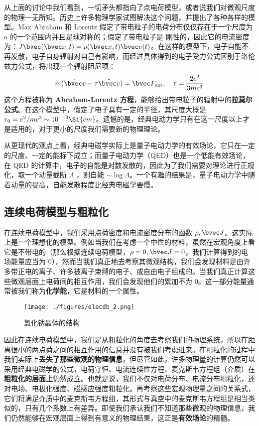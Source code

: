 从上面的讨论中我们看到，一切矛头都指向了点电荷模型，或者说我们对微观尺度的物理一无所知。历史上许多物理学家试图解决这个问题，并提出了各种各样的模型。Max Abraham 和 Lorentz 假定了带电粒子的电荷分布仅仅存在于一个尺度为 $a$ 的一个范围内并且是球对称的；假定了带电粒子是
刚性的，因此它的电流密度为：$J\bvec (\bvec x, t) =\rho(\bvec x, t)\bvec v(t)$。在这样的模型下，电子自能不再发散，电子自身辐射对自己有影响，而经过具体得到的电子受力公式区别于洛伦兹力公式，将出现一个辐射阻尼项：
\begin{equation}
m(\dot{\bvec v}-\tau \ddot{\bvec v})=\bvec F_{\text{ext}},\quad \tau =\frac{2e^2}{3mc^3}
\end{equation}
这个方程被称为 \textbf{Abraham-Lorentz 方程}，能够给出带电粒子的辐射中的\textbf{拉莫尔公式}。在这个模型中，假定了电子具有一定的半径，其尺度大概是 $r_0=e^2/mc^2\sim 10^{-13} \Si{cm}$。遗憾的是，经典电动力学只有在这一尺度以上才是适用的，对于更小的尺度我们需要新的物理理论。

从更现代的观点上看，经典电磁学实际上是量子电动力学的有效场论，它只在一定的尺度、一定的能标下成立；而量子电动力学（QED）也是一个低能有效场论，在 QED 的计算中，电子的自能是对数发散的，因此为了我们需要对理论进行正规化，取一个动量截断 $\Lambda$ ，则自能 $\sim \log \Lambda$。一个有趣的结果是，量子电动力学中随着动量的提高，自能发散程度比经典电磁学要慢。

\subsection{连续电荷模型与粗粒化}
在连续电荷模型中，我们采用点荷密度和电流密度分布的函数 $\rho,\bvec J$。这实际上是一个理想化的模型。例如当我们在考虑一个中性的材料，虽然在宏观角度上看它是不带电的（那么根据连续电荷模型，$\rho=0,\bvec J=0$，我们计算得到的电场能量应当为 $0$），然而当我们真正地去考察其微观结构，我们会发现材料是由许多带正电的离子、许多被离子束缚的电子、或自由电子组成的。当我们真正计算这些微观层面上电荷间的相互作用，我们会发现他们的累加不为 $0$。这一部分能量通常被我们称为\textbf{化学能}，它是材料的一个属性。
\begin{figure}[ht]
\centering
\texttt{[image: ./figures/elecdb\_2.png]}
\caption{氯化钠晶体的结构} \label{elecdb_fig2}
\end{figure}


因此在连续电荷模型中，我们是从粗粒化的角度去考察我们的物理系统，所以在距离很小的两点荷之间的相互作用的信息并没有被我们考虑进来。在粗粒化的过程中我们实际上\textbf{丢失了那些微观的物理信息}，但尽管如此，许多物理量的计算仍然可以采用经典电磁学的公式，电荷守恒、电流连续性方程、麦克斯韦方程组（介质）在\textbf{粗粒化的层面上}仍然成立。也就是说，我们不仅对电荷分布、电流分布粗粒化，还对电场、电极化强度、磁感应强度粗粒化。再考察这些宏观物理量之间的关系式，它们将满足介质中的麦克斯韦方程组，其形式与真空中的麦克斯韦方程组是相当类似的，只有几个系数上有差异。即使我们承认我们不知道那些微观的物理信息，我们仍然能够在宏观层面上得到有意义的物理结果，这正是\textbf{有效场论}的精髓。